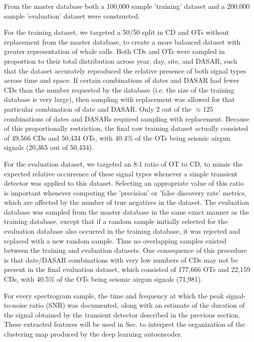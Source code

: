 \documentclass[preprint,NumberedRefs]{JASAnew}
\begin{document}
From the master database both a 100,000 sample 'training' dataset and a 200,000 sample 'evaluation' dataset were constructed.

For the training dataset, we targeted a 50/50 split in CD and OTs without replacement from the master database, to create a more balanced dataset with greater representation of whale calls.  Both CDs and OTs were sampled in proportion to their total distribution across year, day, site, and DASAR, such that the dataset accurately reproduced the relative presence of both signal types across time and space.  If certain combinations of dates and DASAR had fewer CDs than the number requested by the database (i.e. the size of the training database is very large), then sampling with replacement was allowed for that particular combination of date and DASAR.  Only 2 out of the $\approx$125 combinations of dates and DASARs required sampling with replacement.  Because of this proportionally restriction, the final raw training dataset actually consisted of 49,566 CDs and 50,434 OTs, with 40.4\% of the OTs being seismic airgun signals (20,365 out of 50,434).
  

For the evaluation dataset, we targeted an 8:1 ratio of OT to CD, to mimic the expected relative occurrence of these signal types whenever a simple transient detector was applied to this dataset.  Selecting an appropriate value of this ratio is important whenever computing the 'precision' or 'false discovery rate' metrics, which are affected by the number of true negatives in the dataset.  The evaluation database was sampled from the master database in the same exact manner as the training database, except that if a random sample initially selected for the evaluation database also occurred in the training database, it was rejected and replaced with a new random sample.  Thus no overlapping samples existed between the training and evaluation datasets.  One consequence of this procedure is that date/DASAR combinations with very low numbers of CDs may not be present in the final evaluation dataset, which consisted of 177,666 OTs and 22,159 CDs, with 40.5\% of the OTs being seismic airgun signals (71,981).

For every spectrogram sample, the time and frequency at which the peak signal-to-noise ratio (SNR) was documented, along with an estimate of the duration of the signal obtained by the transient detector described in the previous section.  These extracted features will be used in Sec. to interpret the organization of the clustering map produced by the deep learning autoencoder.
\end{document}
